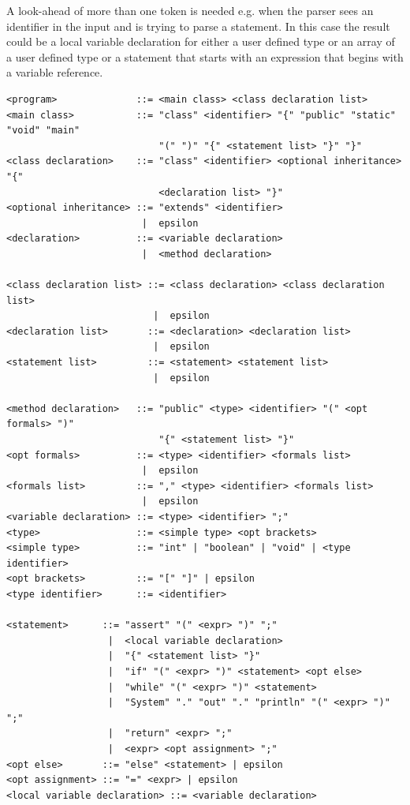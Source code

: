 \documentclass[a4paper,11pt]{article}
\begin{document}
A look-ahead of more than one token is needed e.g. when the parser sees an identifier in the input and is trying to parse a statement. In this case the result could be a local variable declaration for either a user defined type or an array of a user defined type or a statement that starts with an expression that begins with a variable reference.

\begin{verbatim}
<program>              ::= <main class> <class declaration list>
<main class>           ::= "class" <identifier> "{" "public" "static" "void" "main"
                           "(" ")" "{" <statement list> "}" "}"
<class declaration>    ::= "class" <identifier> <optional inheritance> "{"
                           <declaration list> "}"
<optional inheritance> ::= "extends" <identifier>
                        |  epsilon
<declaration>          ::= <variable declaration>
                        |  <method declaration>

<class declaration list> ::= <class declaration> <class declaration list>
                          |  epsilon
<declaration list>       ::= <declaration> <declaration list>
                          |  epsilon
<statement list>         ::= <statement> <statement list>
                          |  epsilon

<method declaration>   ::= "public" <type> <identifier> "(" <opt formals> ")"
                           "{" <statement list> "}"
<opt formals>          ::= <type> <identifier> <formals list>
                        |  epsilon
<formals list>         ::= "," <type> <identifier> <formals list>
                        |  epsilon
<variable declaration> ::= <type> <identifier> ";"
<type>                 ::= <simple type> <opt brackets>
<simple type>          ::= "int" | "boolean" | "void" | <type identifier>
<opt brackets>         ::= "[" "]" | epsilon
<type identifier>      ::= <identifier>

<statement>      ::= "assert" "(" <expr> ")" ";"
                  |  <local variable declaration>
                  |  "{" <statement list> "}"
                  |  "if" "(" <expr> ")" <statement> <opt else>
                  |  "while" "(" <expr> ")" <statement>
                  |  "System" "." "out" "." "println" "(" <expr> ")" ";"
                  |  "return" <expr> ";"
                  |  <expr> <opt assignment> ";"
<opt else>       ::= "else" <statement> | epsilon
<opt assignment> ::= "=" <expr> | epsilon
<local variable declaration> ::= <variable declaration>


\end{verbatim}
\end{document}
